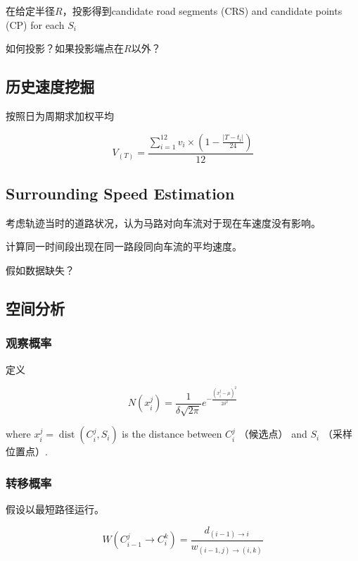 在给定半径$R$，投影得到candidate road segments (CRS) and candidate points (CP) for each $S_i$

\begin{remark}
    如何投影？如果投影端点在$R$以外？
\end{remark}

\subsection{历史速度挖掘}

按照日为周期求加权平均

$$ V_{(T)}=\frac{\sum_{i=1}^{12} v_{i} \times\left(1-\frac{\left|T-t_{i}\right|}{24}\right)}{12} $$

\subsection{Surrounding Speed Estimation}

考虑轨迹当时的道路状况，认为马路对向车流对于现在车速度没有影响。

计算同一时间段出现在同一路段同向车流的平均速度。

\begin{remark}
    假如数据缺失？
\end{remark}

\subsection{空间分析}

\subsubsection{观察概率}

定义

$$ N\left(x_{i}^{j}\right)=\frac{1}{\delta \sqrt{2 \pi}} e^{-\frac{\left(x_{i}^{j}-\mu\right)^{2}}{2 \delta^{2}}} $$

where $ x_{i}^{j}=\operatorname{dist}\left(C_{i}^{j}, S_{i}\right) $ is the distance between $ C_{i}^{j} $ （候选点） and $ S_{i} $ （采样位置点）.

\subsubsection{转移概率}

假设以最短路径运行。

$$ W\left(C_{i-1}^{j} \rightarrow C_{i}^{k}\right)=\frac{d_{(i-1) \rightarrow i}}{w_{(i-1, j) \rightarrow(i, k)}} $$

